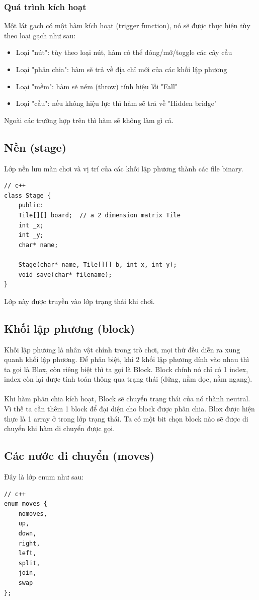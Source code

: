 \documentclass[a4paper, 11pt]{article}
\begin{document}
\subsubsection{Quá trình kích hoạt}
Một lát gạch có một hàm kích hoạt (trigger function), nó sẽ được thực hiện tùy theo loại gạch như sau:
\begin{itemize}
	\item Loại "nút": tùy theo loại nút, hàm có thể đóng/mở/toggle các cây cầu
	\item Loại "phân chia": hàm sẽ trả về địa chỉ mới của các khối lập phương
	\item Loại "mềm": hàm sẽ ném (throw) tính hiệu lỗi "Fall"
	\item Loại "cầu": nếu không hiệu lực thì hàm sẽ trả về "Hidden bridge"
\end{itemize}
Ngoài các trường hợp trên thì hàm sẽ không làm gì cả.
\subsection{Nền (stage)}
Lớp nền lưu màn chơi và vị trí của các khối lập phương thành các file binary.
\begin{verbatim}
// c++
class Stage {
    public:
    Tile[][] board;  // a 2 dimension matrix Tile
    int _x;
    int _y;
    char* name;
    
    Stage(char* name, Tile[][] b, int x, int y);
    void save(char* filename);
}
\end{verbatim}
Lớp này được truyền vào lớp trạng thái khi chơi.
\subsection{Khối lập phương (block)}
Khối lập phương là nhân vật chính trong trò chơi, mọi thứ đều diễn ra xung quanh khối lập phương.
Để phân biệt, khi 2 khối lập phương dính vào nhau thì ta gọi là Blox, còn riêng biệt thì ta gọi là Block.
Block chính nó chỉ có 1 index, index còn lại được tính toán thông qua trạng thái (đứng, nằm dọc, nằm ngang). \\~\\
Khi hàm phân chia kích hoạt, Block sẽ chuyển trạng thái của nó thành neutral. Vì thế ta cần thêm 1 block để
đại diện cho block được phân chia. Blox được hiện thực là 1 array ở trong lớp trạng thái. Ta có một bit chọn
block nào sẽ được di chuyển khi hàm di chuyển được gọi.
\subsection{Các nước di chuyển (moves)}
Đây là lớp enum như sau:
\begin{verbatim}
// c++
enum moves {
    nomoves,
    up,
    down,
    right,
    left,
    split,
    join,
    swap
};
\end{verbatim}
\end{document}
